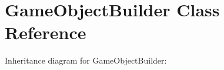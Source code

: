 \hypertarget{classGameObjectBuilder}{}\section{Game\+Object\+Builder Class Reference}
\label{classGameObjectBuilder}


Inheritance diagram for Game\+Object\+Builder\+:
